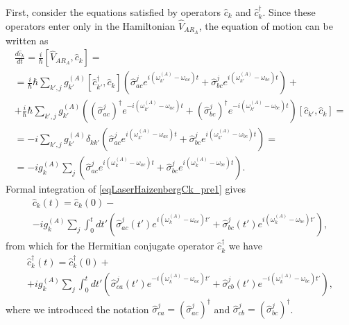First, consider the equations satisfied by operators
$\hat{c}_k$ and $\hat{c}_k^{\dag}$. Since these operators enter only in
the Hamiltonian $\hat{V}_{AR_A}$, the equation of motion can be written as
\begin{eqnarray}
\frac{d \hat{c}_k}{d t} = \frac{i}{\hbar}\left[\hat{V}_{AR_A}, \hat{c}_k
\right] = 
\nonumber \\
= \frac{i}{\hbar} \hbar 
\sum_{k',j} 
g_{k'}^{(A)}\left[\hat{c}_{k'}^{\dag}, \hat{c}_k\right]
\left(
\hat{\sigma}_{ac}^{j} e^{i\left(\omega_{k'}^{(A)} - \omega_{ac}\right)t}
+
\hat{\sigma}_{bc}^{j} e^{i\left(\omega_{k'}^{(A)} - \omega_{bc}\right)t}
\right) +
\nonumber \\
+
\frac{i}{\hbar} \hbar 
\sum_{k',j} 
g_{k'}^{(A)}
\left(
\left(\hat{\sigma}_{ac}^{j}\right)^{\dag} e^{- i\left(\omega_{k'}^{(A)} - \omega_{ac}\right)t}
+
\left(\hat{\sigma}_{bc}^{j}\right)^{\dag} e^{- i\left(\omega_{k'}^{(A)} - \omega_{bc}\right)t}
\right)
\left[\hat{c}_{k'}, \hat{c}_k\right] =
\nonumber \\
= 
 - i 
\sum_{k',j} 
g_{k'}^{(A)}\delta_{kk'}
\left(
\hat{\sigma}_{ac}^{j} e^{i\left(\omega_{k'}^{(A)} - \omega_{ac}\right)t}
+
\hat{\sigma}_{bc}^{j} e^{i\left(\omega_{k'}^{(A)} - \omega_{bc}\right)t}
\right) = 
\nonumber \\
=
 - i g_{k}^{(A)}
\sum_{j} 
\left(
\hat{\sigma}_{ac}^{j} e^{i\left(\omega_{k}^{(A)} - \omega_{ac}\right)t}
+
\hat{\sigma}_{bc}^{j} e^{i\left(\omega_{k}^{(A)} - \omega_{bc}\right)t}
\right).
\label{eqLaserHaizenbergCk_pre1}
\end{eqnarray} 
Formal integration of \eqref{eqLaserHaizenbergCk_pre1} gives
\begin{eqnarray}
\hat{c}_k\left(t\right) = \hat{c}_k\left(0\right) -
\nonumber \\
 - i g_{k}^{(A)}
\sum_{j} 
\int_0^t d t'
\left(
\hat{\sigma}_{ac}^{j}\left(t'\right) e^{i\left(\omega_{k}^{(A)} - \omega_{ac}\right)t'}
+
\hat{\sigma}_{bc}^{j}\left(t'\right) e^{i\left(\omega_{k}^{(A)} - \omega_{bc}\right)t'}
\right),
\label{eqLaserHaizenbergCk}
\end{eqnarray}
from which for the Hermitian conjugate operator $\hat{c}_k^{\dag}$ we have
\begin{eqnarray}
\hat{c}_k^{\dag}\left(t\right) = \hat{c}_k^{\dag}\left(0\right) +
\nonumber \\
 + i g_{k}^{(A)}
\sum_{j} 
\int_0^t d t'
\left(
\hat{\sigma}_{ca}^{j}\left(t'\right) e^{-i\left(\omega_{k}^{(A)} - \omega_{ac}\right)t'}
+
\hat{\sigma}_{cb}^{j}\left(t'\right) e^{-i\left(\omega_{k}^{(A)} - \omega_{bc}\right)t'}
\right),
\label{eqLaserHaizenbergCkPlus}
\end{eqnarray}
where we introduced the notation $\hat{\sigma}_{ca}^{j} =
\left(\hat{\sigma}_{ac}^{j}\right)^{\dag}$ and
$\hat{\sigma}_{cb}^{j} = \left(\hat{\sigma}_{bc}^{j}\right)^{\dag}$.

